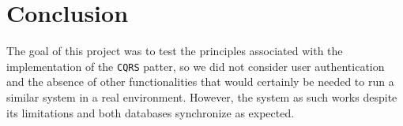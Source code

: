 \documentclass[12pt,english]{article}
\begin{document}
\section{Conclusion}
The goal of this project was to test the principles associated with the implementation of the \texttt{CQRS} patter, so we did not consider user authentication and the absence of other functionalities that would certainly be needed to run a similar system in a real environment. However, the system as such works despite its limitations and both databases synchronize as expected.

%
%
\end{document}
